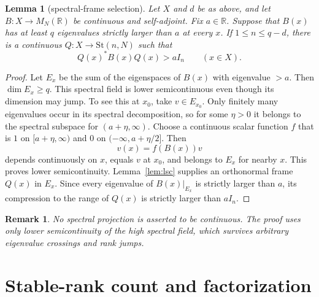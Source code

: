 \documentclass[11pt]{article}
\newtheorem{lemma}[theorem]{Lemma}
\newtheorem{remark}[theorem]{Remark}
\newcommand{\R}{\mathbb R}
\newcommand{\St}{\mathrm{St}}
\begin{document}
\begin{lemma}[spectral-frame selection]\label{lem:selection}
Let $X$ and $d$ be as above, and let $B:X\to M_N(\R)$ be continuous and
self-adjoint.  Fix $a\in\R$.  Suppose that $B(x)$ has at least $q$
eigenvalues strictly larger than $a$ at every $x$.  If
$1\leq n\leq q-d$, there is a continuous $Q:X\to\St(n,N)$ such that
\[
 Q(x)^*B(x)Q(x)>aI_n\qquad(x\in X).
\]
\end{lemma}

\begin{proof}
Let $E_x$ be the sum of the eigenspaces of $B(x)$ with eigenvalue $>a$.
Then $\dim E_x\geq q$.  This spectral field is lower semicontinuous even
though its dimension may jump.  To see this at $x_0$, take $v\in E_{x_0}$.
Only finitely many eigenvalues occur in its spectral decomposition, so for
some $\eta>0$ it belongs to the spectral subspace for $(a+\eta,\infty)$.
Choose a continuous scalar function $f$ that is $1$ on
$[a+\eta,\infty)$ and $0$ on $(-\infty,a+\eta/2]$.  Then
\[
 v(x)=f(B(x))v
\]
depends continuously on $x$, equals $v$ at $x_0$, and belongs to $E_x$ for
nearby $x$.  This proves lower semicontinuity.  Lemma~\ref{lem:lsc} supplies
an orthonormal frame $Q(x)$ in $E_x$.  Since every eigenvalue of
$B(x)|_{E_x}$ is strictly larger than $a$, its compression to the range of
$Q(x)$ is strictly larger than $aI_n$.
\end{proof}

\begin{remark}
No spectral projection is asserted to be continuous.  The proof uses only
lower semicontinuity of the high spectral field, which survives arbitrary
eigenvalue crossings and rank jumps.
\end{remark}

\section{Stable-rank count and factorization}
\end{document}
